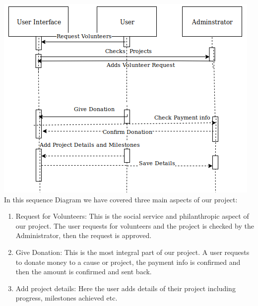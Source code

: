 \documentclass{scrreprt}
\begin{document}
\includegraphics[width=\textwidth]{images/seq2.png}
In this sequence Diagram we have covered three main aspects of our project:
\begin{enumerate}
    \item Request for Volunteers: This is the social service and philanthropic aspect of our project. The user requests for volunteers and the project is checked by the Administrator, then the request is approved.
    \item Give Donation: This is the most integral part of our project. A user requests to donate money to a cause or project, the payment info is confirmed and then the amount is confirmed and sent back.
    \item Add project details: Here the user adds details of their project including progress, milestones achieved etc.
\end{enumerate}
\end{document}
